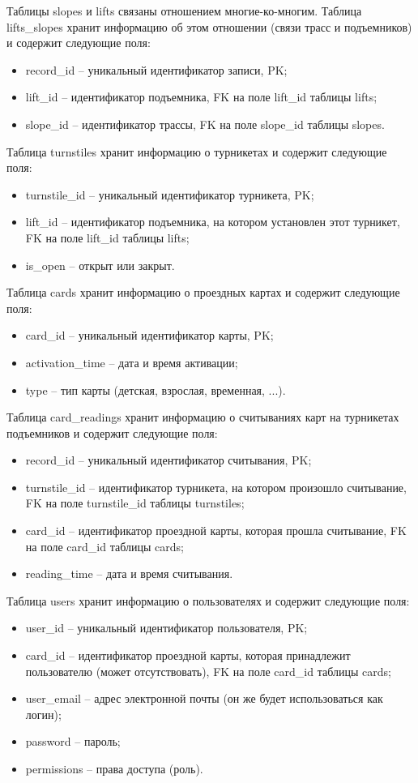 Таблицы slopes и lifts связаны отношением многие-ко-многим. Таблица lifts\_slopes хранит информацию об этом отношении (связи трасс и подъемников) и содержит следующие поля:
\begin{itemize}
	\item record\_id -- уникальный идентификатор записи, PK;
	\item lift\_id -- идентификатор подъемника, FK на поле lift\_id таблицы lifts;
	\item slope\_id -- идентификатор трассы, FK на поле slope\_id таблицы slopes.
\end{itemize}


Таблица turnstiles хранит информацию о турникетах и содержит следующие поля:
\begin{itemize}
	\item turnstile\_id -- уникальный идентификатор турникета, PK;
	\item lift\_id -- идентификатор подъемника, на котором установлен этот турникет, FK на поле lift\_id таблицы lifts;
	\item is\_open -- открыт или закрыт.
\end{itemize}


Таблица cards хранит информацию о проездных картах и содержит следующие поля:
\begin{itemize}
	\item card\_id -- уникальный идентификатор карты, PK;
	\item activation\_time -- дата и время активации;
	\item type -- тип карты (детская, взрослая, временная, ...).
\end{itemize}


Таблица card\_readings хранит информацию о считываниях карт на турникетах подъемников и содержит следующие поля:
\begin{itemize}
	\item record\_id -- уникальный идентификатор считывания, PK;
	\item turnstile\_id -- идентификатор турникета, на котором произошло считывание, FK на поле turnstile\_id таблицы turnstiles;
	\item card\_id -- идентификатор проездной карты, которая прошла считывание, FK на поле card\_id таблицы cards;
	\item reading\_time -- дата и время считывания.
\end{itemize}


Таблица users хранит информацию о пользователях и содержит следующие поля:
\begin{itemize}
	\item user\_id -- уникальный идентификатор пользователя, PK;
	\item card\_id -- идентификатор проездной карты, которая принадлежит пользователю (может отсутствовать), FK на поле card\_id таблицы cards;
	\item user\_email -- адрес электронной почты (он же будет использоваться как логин);
	\item password -- пароль;
	\item permissions -- права доступа (роль).
\end{itemize}


